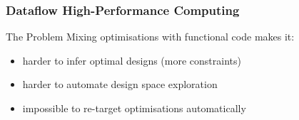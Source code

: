 \begin{frame}[fragile]
  \frametitle{Dataflow High-Performance Computing}

  \begin{beamerboxesrounded}{The Problem}
    Mixing optimisations with functional code makes it:
    \begin{itemize}
    \setlength{\itemsep}{10pt}
    \item harder to infer optimal designs (more constraints)
    \item harder to automate design space exploration
    \item impossible to re-target optimisations automatically
    \end{itemize}
  \end{beamerboxesrounded}
\end{frame}

